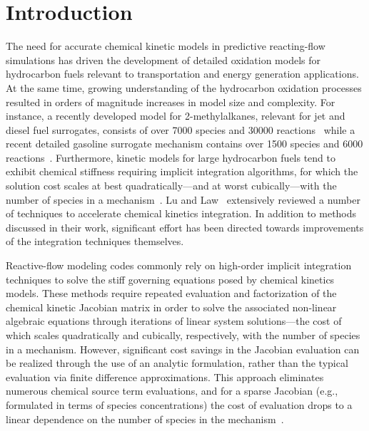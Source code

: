 \documentclass[preprint]{elsarticle}
\begin{document}
\clearpage

\section{Introduction}
\label{sec:Intro}

The need for accurate chemical kinetic models in predictive reacting-flow simulations has driven the development of detailed oxidation models for hydrocarbon fuels relevant to transportation and energy generation applications.
At the same time, growing understanding of the hydrocarbon oxidation processes resulted in orders of magnitude increases in model size and complexity.
For instance, a recently developed model for 2-methylalkanes, relevant for jet and diesel fuel surrogates, consists of over 7000 species and 30000 reactions~\cite{Sarathy:2011kx} while a recent detailed gasoline surrogate mechanism contains over 1500 species and 6000 reactions~\cite{Mehl:2011jn}.
Furthermore, kinetic models for large hydrocarbon fuels tend to exhibit chemical stiffness requiring implicit integration algorithms, for which the solution cost scales at best quadratically---and at worst cubically---with the number of species in a mechanism~\cite{Lu:2009gh}.
Lu and Law~\cite{Lu:2009gh} extensively reviewed a number of techniques to accelerate chemical kinetics integration.
In addition to methods discussed in their work, significant effort has been directed towards improvements of the integration techniques themselves.

Reactive-flow modeling codes commonly rely on high-order implicit integration techniques to solve the stiff governing equations posed by chemical kinetics models.
These methods require repeated evaluation and factorization of the chemical kinetic Jacobian matrix in order to solve the associated non-linear algebraic equations through iterations of linear system solutions---the cost of which scales quadratically and cubically, respectively, with the number of species in a mechanism.
However, significant cost savings in the Jacobian evaluation can be realized through the use of an analytic formulation, rather than the typical evaluation via finite difference approximations.
This approach eliminates numerous chemical source term evaluations, and for a sparse Jacobian (e.g., formulated in terms of species concentrations) the cost of evaluation drops to a linear dependence on the number of species in the mechanism~\cite{Lu:2009gh}.
\end{document}
